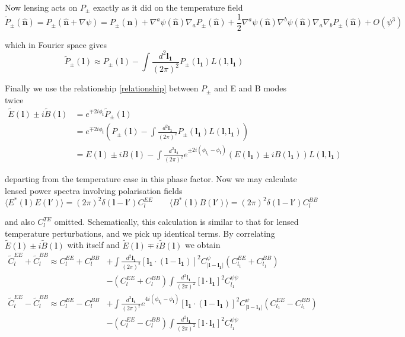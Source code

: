 \documentclass[a4paper,10pt]{article}
\renewcommand{\v}[1]{\mathbf{#1}}
\newcommand{\half}{\frac{1}{2}}
\newcommand{\finttwo}[1]{\int \frac{d^2 \v{#1}}{(2\pi)^2}}
\newcommand{\unit}[1]{\hat{\v{#1}}}
\begin{document}
Now lensing acts on $P_{\pm}$ exactly as it did on the temperature field 
\begin{equation}
\tilde{P}_{\pm}(\unit{n}) = P_{\pm}(\unit{n}+\nabla\psi) =P_{\pm}(\unit{n})+\nabla^a\psi(\unit{n})\nabla_aP_{\pm}(\unit{n})+\half\nabla^a\psi(\unit{n})\nabla^b\psi(\unit{n})\nabla_a\nabla_bP_{\pm}(\unit{n}) + O(\psi^3)
\end{equation}

which in Fourier space gives
\begin{equation}
\tilde{P}_{\pm}(\v{l}) \approx P_{\pm}(\v{l}) - \finttwo{l_1} P_{\pm}(\v{l_1})L(\v{l},\v{l_1})
\end{equation}

Finally we use the relationship \ref{relationship} between $P_\pm$ and E and B modes twice
\begin{equation}\begin{split}
\tilde{E}(\v{l})\pm i\tilde{B}(\v{l}) &= e^{\mp 2i\phi_\v{l}}\tilde{P}_{\pm}(\v{l})\\
&=e^{\mp 2i\phi_\v{l}}\left(P_{\pm}(\v{l}) - \finttwo{l_1} P_{\pm}(\v{l_1})L(\v{l},\v{l_1})\right)\\
&=E(\v{l})\pm iB(\v{l})-\finttwo{l_1} e^{\pm 2i(\phi_\v{l_1}-\phi_\v{l})}(E(\v{l_1})\pm iB(\v{l_1}))L(\v{l},\v{l_1})
\label{lensedEBmodes}
\end{split}\end{equation}



departing from the temperature case in this phase factor. Now we may calculate lensed power spectra involving polarisation fields
\begin{equation}
\langle E^*(\v{l})E(\v{l}')\rangle = (2\pi)^2\delta(\v{l}-\v{l}')C_l^{EE} \qquad \langle B^*(\v{l})B(\v{l}')\rangle = (2\pi)^2\delta(\v{l}-\v{l}')C_l^{BB}
\end{equation}

and also $C_l^{TE}$ omitted. Schematically, this calculation is similar to that for lensed temperature perturbations, and we pick up identical terms. By correlating $\tilde{E}(\v{l})\pm i\tilde{B}(\v{l})$ with itself and $\tilde{E}(\v{l})\mp i\tilde{B}(\v{l})$ we obtain
\begin{equation}\begin{split}
\tilde{C}_l^{EE}+\tilde{C}_l^{BB} \approx C_l^{EE}+C_l^{BB}&+\finttwo{l_1}[ \v{l_1}\cdot(\v{l}-\v{l_1})]^2 C^\psi_{|\v{l}-\v{l_1}|}(C_{l_1}^{EE}+C_{l_1}^{BB}) \\
&- (C_{l}^{EE}+C_{l}^{BB})\finttwo{l_1} [\v{l}\cdot\v{l_1}]^2C_{l_1}^{\psi\psi}\\
\tilde{C}_l^{EE}-\tilde{C}_l^{BB} \approx C_l^{EE}-C_l^{BB}&+\finttwo{l_1}e^{4i(\phi_{\v{l_1}}-\phi_\v{l})}[ \v{l_1}\cdot(\v{l}-\v{l_1})]^2 C^\psi_{|\v{l}-\v{l_1}|}(C_{l_1}^{EE}-C_{l_1}^{BB})\\
&- (C_{l}^{EE}-C_{l}^{BB})\finttwo{l_1} [\v{l}\cdot\v{l_1}]^2C_{l_1}^{\psi\psi}
\end{split}\end{equation}
\end{document}
